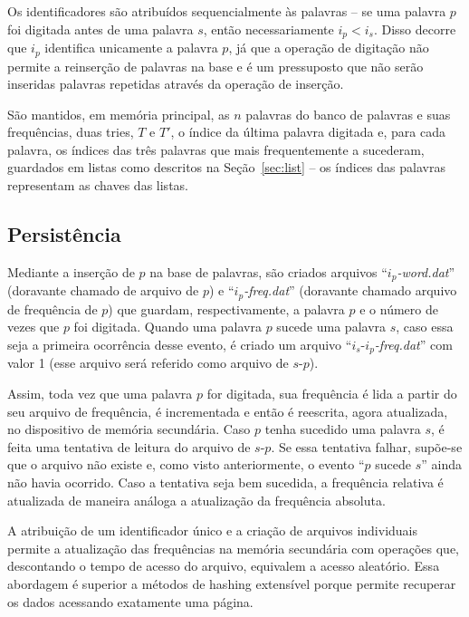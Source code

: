 \documentclass[12pt]{article}
\begin{document}
    Os identificadores são atribuídos sequencialmente às palavras -- se uma palavra $p$ foi digitada antes de uma palavra $s$, então necessariamente $i_p < i_s$.
    Disso decorre que $i_p$ identifica unicamente a palavra $p$, já que a operação de digitação não permite a reinserção de palavras na base e é um pressuposto que não serão inseridas palavras repetidas através da operação de inserção.

    São mantidos, em memória principal, as $n$ palavras do banco de palavras e suas frequências, duas tries, $T$ e $T'$, o índice da última palavra digitada e, para cada palavra, os índices das três palavras que mais frequentemente a sucederam, guardados em listas como descritos na Seção~\ref{sec:list} -- os índices das palavras representam as chaves das listas.

    \subsection{Persistência}
    Mediante a inserção de $p$ na base de palavras, são criados arquivos ``$i_p$\emph{-word.dat}'' (doravante chamado de arquivo de $p$) e ``$i_p$\emph{-freq.dat}'' (doravante chamado arquivo de frequência de $p$) que guardam, respectivamente, a palavra $p$ e o número de vezes que $p$ foi digitada.
    Quando uma palavra $p$ sucede uma palavra $s$, caso essa seja a primeira ocorrência desse evento, é criado um arquivo ``$i_s$-$i_p$\emph{-freq.dat}'' com valor 1 (esse arquivo será referido como arquivo de $s$-$p$).

    Assim, toda vez que uma palavra $p$ for digitada, sua frequência é lida a partir do seu arquivo de frequência, é incrementada e então é reescrita, agora atualizada, no dispositivo de memória secundária.
    Caso $p$ tenha sucedido uma palavra $s$, é feita uma tentativa de leitura do arquivo de $s$-$p$.
    Se essa tentativa falhar, supõe-se que o arquivo não existe e, como visto anteriormente, o evento ``$p$ sucede $s$'' ainda não havia ocorrido.
    Caso a tentativa seja bem sucedida, a frequência relativa é atualizada de maneira análoga a atualização da frequência absoluta.

    A atribuição de um identificador único e a criação de arquivos individuais permite a atualização das frequências na memória secundária com operações que, descontando o tempo de acesso do arquivo, equivalem a acesso aleatório.
    Essa abordagem é superior a métodos de hashing extensível porque permite recuperar os dados acessando exatamente uma página.
\end{document}
